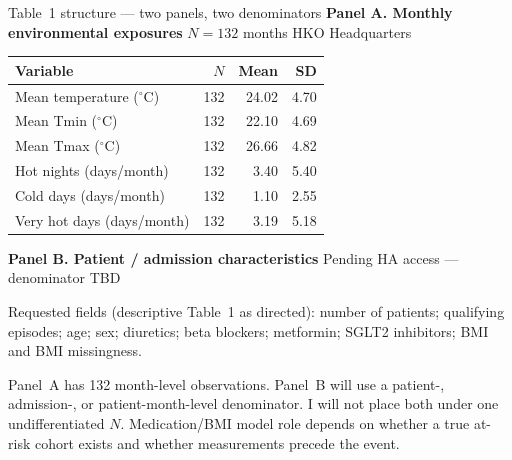 \documentclass[aspectratio=169,10pt]{beamer}
\begin{document}
\begin{frame}{Table~1 structure --- two panels, two denominators}
  \textbf{Panel A. Monthly environmental exposures} \hfill
  {\footnotesize $N = 132$ months \quad HKO Headquarters}

  \vspace{0.25em}
  \scriptsize
  \begin{tabular}{@{}lrrr@{}}
    \toprule
    Variable & $N$ & Mean & SD \\
    \midrule
    Mean temperature ($^\circ$C) & 132 & 24.02 & 4.70 \\
    Mean Tmin ($^\circ$C) & 132 & 22.10 & 4.69 \\
    Mean Tmax ($^\circ$C) & 132 & 26.66 & 4.82 \\
    Hot nights (days/month) & 132 & 3.40 & 5.40 \\
    Cold days (days/month) & 132 & 1.10 & 2.55 \\
    Very hot days (days/month) & 132 & 3.19 & 5.18 \\
    \bottomrule
  \end{tabular}

  \vspace{0.55em}
  \normalsize
  \textbf{Panel B. Patient / admission characteristics} \hfill
  {\footnotesize Pending HA access --- denominator TBD}

  \vspace{0.2em}
  \footnotesize
  Requested fields (descriptive Table~1 as directed): number of patients;
  qualifying episodes; age; sex; diuretics; beta blockers; metformin;
  SGLT2 inhibitors; BMI and BMI missingness.

  \vspace{0.45em}
  \footnotesize
  Panel~A has 132 month-level observations. Panel~B will use a patient-,
  admission-, or patient-month-level denominator. I will not place both under
  one undifferentiated $N$. Medication/BMI model role depends on whether a true
  at-risk cohort exists and whether measurements precede the event.
\end{frame}
\end{document}
